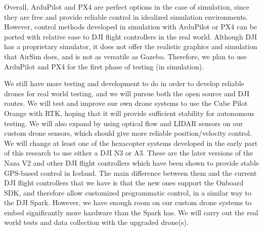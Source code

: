 Overall, ArduPilot and PX4 are perfect options in the case of simulation,
since they are free and provide reliable control in idealized simulation environments.
However, control methods developed in simulation with ArduPilot or PX4 can be ported with relative ease to DJI flight controllers in the real world.
Although DJI has a proprietary simulator, it does not offer the realistic graphics and simulation that AirSim does,
and is not as versatile as Gazebo.
Therefore, we plan to use ArduPilot and PX4 for the first phase of testing (in simulation).

We still have more testing and development to do in order to develop reliable drones for real world testing,
and we will pursue both the open source and DJI routes.
We will test and improve our own drone systems to use the Cube Pilot Orange with RTK,
hoping that it will provide sufficient stability for autonomous testing.
We will also expand by using optical flow and LIDAR sensors on our custom drone sensors,
which should give more reliable position/velocity control.
We will change at least one of the hexacopter systems developed in the early part of this research to use either a
DJI N3 or A3.
These are the later versions of the Naza V2 and other DJI flight controllers which have been shown to provide stable
GPS-based control in Iceland.
The main difference between them and the current DJI flight controllers that we have is that the new ones support the
Onboard SDK, and therefore allow customized programmatic control, in a similar way to the DJI Spark.
However, we have enough room on our custom drone systems to embed significantly more hardware than the Spark has.
We will carry out the real world tests and data collection with the upgraded drone(s).